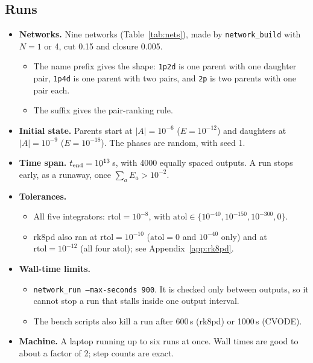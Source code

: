 \documentclass[10pt,a4paper]{article}
\newcommand{\atol}{\mathrm{atol}}
\newcommand{\rtol}{\mathrm{rtol}}
\begin{document}
\subsection{Runs}
\begin{itemize}
    \item \textbf{Networks.} Nine networks (Table~\ref{tab:nets}), made by \texttt{network\_build} with $N=1$ or 4, cut 0.15 and closure 0.005.
        \begin{itemize}
            \item The name prefix gives the shape: \texttt{1p2d} is one parent with one daughter pair, \texttt{1p4d} is one parent with two pairs, and \texttt{2p} is two parents with one pair each.
            \item The suffix gives the pair-ranking rule.
        \end{itemize}
    \item \textbf{Initial state.} Parents start at $|A|=10^{-6}$ ($E=10^{-12}$) and daughters at $|A|=10^{-9}$ ($E=10^{-18}$). The phases are random, with seed 1.
    \item \textbf{Time span.} $t_{\rm end}=10^{13}$\,s, with 4000 equally spaced outputs. A run stops early, as a runaway, once $\sum_a E_a>10^{-2}$.
    \item \textbf{Tolerances.}
        \begin{itemize}
            \item All five integrators: $\rtol=10^{-8}$, with $\atol\in\{10^{-40},10^{-150},10^{-300},0\}$.
            \item rk8pd also ran at $\rtol=10^{-10}$ ($\atol=0$ and $10^{-40}$ only) and at $\rtol=10^{-12}$ (all four $\atol$); see Appendix~\ref{app:rk8pd}.
        \end{itemize}
    \item \textbf{Wall-time limits.}
        \begin{itemize}
            \item \texttt{network\_run --max-seconds 900}. It is checked only between outputs, so it cannot stop a run that stalls inside one output interval.
            \item The bench scripts also kill a run after 600\,s (rk8pd) or 1000\,s (CVODE).
        \end{itemize}
    \item \textbf{Machine.} A laptop running up to six runs at once. Wall times are good to about a factor of 2; step counts are exact.
\end{itemize}
\end{document}
